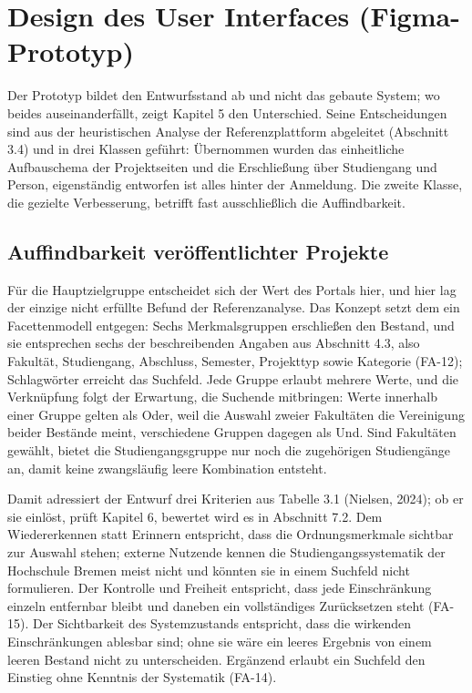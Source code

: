 \section{Design des User Interfaces (Figma-Prototyp)}
\label{sec:ui-design}

Der Prototyp bildet den Entwurfsstand ab und nicht das gebaute System; wo beides auseinanderfällt, zeigt Kapitel 5 den Unterschied. Seine Entscheidungen sind aus der heuristischen Analyse der Referenzplattform abgeleitet (Abschnitt 3.4) und in drei Klassen geführt: Übernommen wurden das einheitliche Aufbauschema der Projektseiten und die Erschließung über Studiengang und Person, eigenständig entworfen ist alles hinter der Anmeldung. Die zweite Klasse, die gezielte Verbesserung, betrifft fast ausschließlich die Auffindbarkeit.

\subsection{Auffindbarkeit veröffentlichter Projekte}

Für die Hauptzielgruppe entscheidet sich der Wert des Portals hier, und hier lag der einzige nicht erfüllte Befund der Referenzanalyse. Das Konzept setzt dem ein Facettenmodell entgegen: Sechs Merkmalsgruppen erschließen den Bestand, und sie entsprechen sechs der beschreibenden Angaben aus Abschnitt 4.3, also Fakultät, Studiengang, Abschluss, Semester, Projekttyp sowie Kategorie (FA-12); Schlagwörter erreicht das Suchfeld. Jede Gruppe erlaubt mehrere Werte, und die Verknüpfung folgt der Erwartung, die Suchende mitbringen: Werte innerhalb einer Gruppe gelten als Oder, weil die Auswahl zweier Fakultäten die Vereinigung beider Bestände meint, verschiedene Gruppen dagegen als Und. Sind Fakultäten gewählt, bietet die Studiengangsgruppe nur noch die zugehörigen Studiengänge an, damit keine zwangsläufig leere Kombination entsteht.

Damit adressiert der Entwurf drei Kriterien aus Tabelle 3.1 (Nielsen, 2024); ob er sie einlöst, prüft Kapitel 6, bewertet wird es in Abschnitt 7.2. Dem Wiedererkennen statt Erinnern entspricht, dass die Ordnungsmerkmale sichtbar zur Auswahl stehen; externe Nutzende kennen die Studiengangssystematik der Hochschule Bremen meist nicht und könnten sie in einem Suchfeld nicht formulieren. Der Kontrolle und Freiheit entspricht, dass jede Einschränkung einzeln entfernbar bleibt und daneben ein vollständiges Zurücksetzen steht (FA-15). Der Sichtbarkeit des Systemzustands entspricht, dass die wirkenden Einschränkungen ablesbar sind; ohne sie wäre ein leeres Ergebnis von einem leeren Bestand nicht zu unterscheiden. Ergänzend erlaubt ein Suchfeld den Einstieg ohne Kenntnis der Systematik (FA-14).

